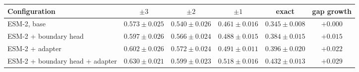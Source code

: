 \begin{tabular}{lccccc}
\toprule
\textbf{Configuration} & $\pm3$ & $\pm2$ & $\pm1$ & exact & \textbf{gap growth} \\
\midrule
ESM-2, base & $0.573 \pm 0.025$ & $0.540 \pm 0.026$ & $0.461 \pm 0.016$ & $0.345 \pm 0.008$ & $+0.000$ \\
ESM-2 + boundary head & $0.597 \pm 0.026$ & $0.566 \pm 0.024$ & $0.488 \pm 0.015$ & $0.384 \pm 0.015$ & $+0.015$ \\
ESM-2 + adapter & $0.602 \pm 0.026$ & $0.572 \pm 0.024$ & $0.491 \pm 0.011$ & $0.396 \pm 0.020$ & $+0.022$ \\
ESM-2 + boundary head + adapter & $0.630 \pm 0.021$ & $0.599 \pm 0.023$ & $0.518 \pm 0.016$ & $0.432 \pm 0.013$ & $+0.029$ \\
\bottomrule
\end{tabular}
